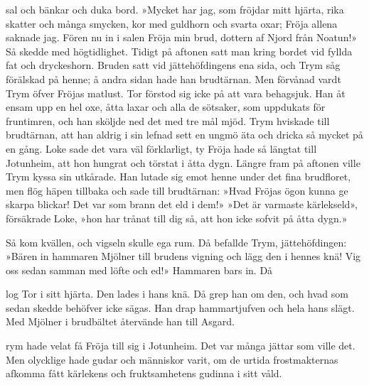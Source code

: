 sal och bänkar och duka bord. »Mycket har jag, som fröjdar mitt hjärta,
rika skatter och många smycken, kor med guldhorn och svarta oxar; Fröja
allena saknade jag. Fören nu in i salen Fröja min brud, dottern af Njord
från Noatun!» Så skedde med högtidlighet. Tidigt på aftonen satt man
kring bordet vid fyllda fat och dryckeshorn. Bruden satt vid
jättehöfdingens ena sida, och Trym såg förälskad på henne; å andra sidan
hade han brudtärnan. Men förvånad vardt Trym öfver Fröjas matlust. Tor
förstod sig icke på att vara behagsjuk. Han åt ensam upp en hel oxe,
åtta laxar och alla de sötsaker, som uppdukats för fruntimren, och han
sköljde ned det med tre mål mjöd. Trym hviskade till brudtärnan, att han
aldrig i sin lefnad sett en ungmö äta och dricka så mycket på en gång.
Loke sade det vara väl förklarligt, ty Fröja hade så längtat till
Jotunheim, att hon hungrat och törstat i åtta dygn. Längre fram på
aftonen ville Trym kyssa sin utkårade. Han lutade sig emot henne under
det fina brudfloret, men flög häpen tillbaka och sade till brudtärnan:
»Hvad Fröjas ögon kunna ge skarpa blickar! Det var som brann det eld i
dem!» »Det är varmaste kärlekseld», försäkrade Loke, »hon har trånat
till dig så, att hon icke sofvit på åtta dygn.»

Så kom kvällen, och vigseln skulle ega rum. Då befallde Trym,
jättehöfdingen: »Bären in hammaren Mjölner till brudens vigning och lägg
den i hennes knä! Vig oss sedan samman med löfte och ed!» Hammaren bars
in. Då

log Tor i sitt hjärta. Den lades i hans knä. Då grep han om den, och
hvad som sedan skedde behöfver icke sägas. Han drap hammartjufven och
hela hans slägt. Med Mjölner i brudbältet återvände han till Asgard.

\endSecII


\dropcapT rym hade velat få Fröja till sig i Jotunheim. Det var många jättar som
ville det. Men olycklige hade gudar och människor varit, om de urtida
frostmakternas afkomma fått kärlekens och fruktsamhetens gudinna i sitt
våld.

